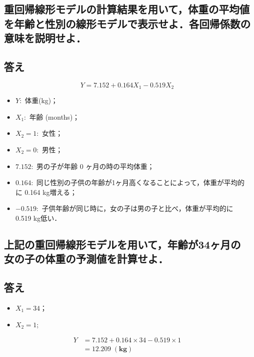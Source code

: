 \documentclass[11pt,]{problemset}
\providecommand{\tightlist}{%
  \setlength{\itemsep}{0pt}\setlength{\parskip}{0pt}}
\begin{document}
\hypertarget{section-25}{%
\subsection{重回帰線形モデルの計算結果を用いて，体重の平均値を年齢と性別の線形モデルで表示せよ．各回帰係数の意味を説明せよ．}\label{section-25}}

\hypertarget{section-26}{%
\subsection{答え}\label{section-26}}

\[
Y = 7.152 + 0.164 X_1 - 0.519X_2
\]

\begin{itemize}
\tightlist
\item
  \(Y:\) 体重(kg)；
\item
  \(X_1:\) 年齢 (months)；
\item
  \(X_2 = 1:\) 女性；
\item
  \(X_2 = 0:\) 男性；
\item
  \(7.152:\) 男の子が年齢 0 ヶ月の時の平均体重；
\item
  \(0.164:\)
  同じ性別の子供の年齢が1ヶ月高くなることによって，体重が平均的に 0.164
  kg増える；
\item
  \(-0.519:\) 子供年齢が同じ時に，女の子は男の子と比べ，体重が平均的に
  0.519 kg低い．
\end{itemize}

\newpage
\vfill

\hypertarget{section-27}{%
\subsection{上記の重回帰線形モデルを用いて，年齢が34ヶ月の女の子の体重の予測値を計算せよ．}\label{section-27}}

\hypertarget{section-28}{%
\subsection{答え}\label{section-28}}

\begin{itemize}
\tightlist
\item
  \(X_1 = 34\)；
\item
  \(X_2 = 1\);
\end{itemize}

\[
\begin{aligned}
Y & = 7.152 + 0.164 \times 34 -0.519\times 1 \\
  & = 12.209\; \mathbf{(kg)}
\end{aligned}
\]
\end{document}
